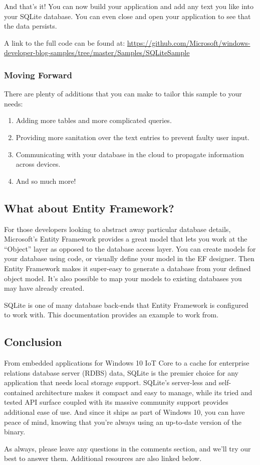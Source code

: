 And that’s it! You can now build your application and add any text you like into your SQLite database. You can even close and open your application to see that the data persists.

A link to the full code can be found at: \url{https://github.com/Microsoft/windows-developer-blog-samples/tree/master/Samples/SQLiteSample}

\subsubsection{Moving Forward}
There are plenty of additions that you can make to tailor this sample to your needs:
\begin{enumerate}
	\item Adding more tables and more complicated queries.
	\item Providing more sanitation over the text entries to prevent faulty user input.
	\item Communicating with your database in the cloud to propagate information across devices.
	\item And so much more!
\end{enumerate}

\subsection{What about Entity Framework?}

For those developers looking to abstract away particular database details, Microsoft’s Entity Framework provides a great model that lets you work at the “Object” layer as opposed to the database access layer. You can create models for your database using code, or visually define your model in the EF designer. Then Entity Framework makes it super-easy to generate a database from your defined object model. It’s also possible to map your models to existing databases you may have already created.

SQLite is one of many database back-ends that Entity Framework is configured to work with. This documentation provides an example to work from.

\subsection{Conclusion}
From embedded applications for Windows 10 IoT Core to a cache for enterprise relations database server (RDBS) data, SQLite is the premier choice for any application that needs local storage support. SQLite’s server-less and self-contained architecture makes it compact and easy to manage, while its tried and tested API surface coupled with its massive community support provides additional ease of use. And since it ships as part of Windows 10, you can have peace of mind, knowing that you’re always using an up-to-date version of the binary.

As always, please leave any questions in the comments section, and we’ll try our best to answer them. Additional resources are also linked below.



